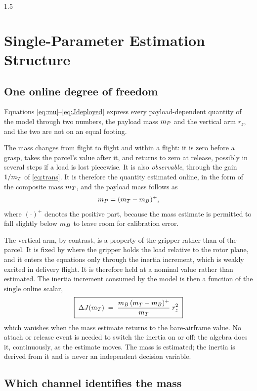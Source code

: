 \begin{spacing}{1.5}
\section{Single-Parameter Estimation Structure}\label{sec:model:onedof}

\subsection{One online degree of freedom}

Equations \eqref{eq:mu}--\eqref{eq:Jdeployed} express every payload-dependent
quantity of the model through two numbers, the payload mass $m_P$ and the
vertical arm $r_z$, and the two are not on an equal footing.

The mass changes from flight to flight and within a flight: it is zero before a
grasp, takes the parcel's value after it, and returns to zero at release,
possibly in several steps if a load is lost piecewise. It is also
\emph{observable}, through the gain $1/m_T$ of \eqref{eq:trans}. It is therefore
the quantity estimated online, in the form of the composite mass $m_T$, and the
payload mass follows as
\begin{equation}
m_P = (m_T - m_B)^{+},
\label{eq:mPplus}
\end{equation}
where $(\cdot)^{+}$ denotes the positive part, because the mass estimate is
permitted to fall slightly below $m_B$ to leave room for calibration error.

The vertical arm, by contrast, is a property of the gripper rather than of the
parcel. It is fixed by where the gripper holds the load relative to the rotor
plane, and it enters the equations only through the inertia increment, which is
weakly excited in delivery flight. It is therefore held at a nominal value
rather than estimated. The inertia increment consumed by the model is then a
function of the single online scalar,
\begin{equation}
\boxed{\;\Delta J(m_T) \;=\; \frac{m_B\,(m_T-m_B)^{+}}{m_T}\;r_z^2\;}
\label{eq:dJofm}
\end{equation}
which vanishes when the mass estimate returns to the bare-airframe value. No
attach or release event is needed to switch the inertia on or off: the algebra
does it, continuously, as the estimate moves. The mass is estimated; the inertia
is derived from it and is never an independent decision variable.

\subsection{Which channel identifies the mass}\label{sec:model:rotchannel}


\end{spacing}
